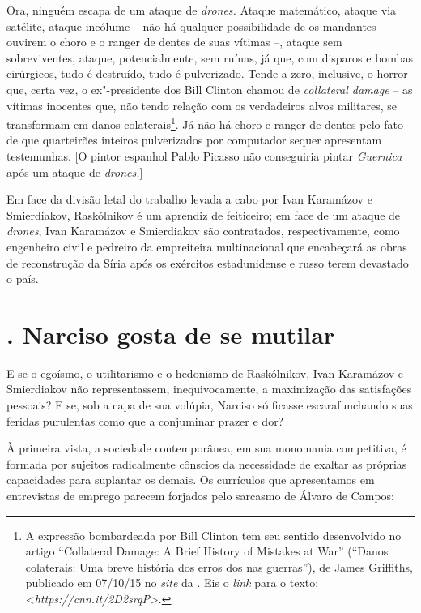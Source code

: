Ora, ninguém escapa de um ataque de \emph{drones.} Ataque matemático,
ataque via satélite, ataque incólume -- não há qualquer possibilidade de
os mandantes ouvirem o choro e o ranger de dentes de suas vítimas --,
ataque sem sobreviventes, ataque, potencialmente, sem ruínas, já que,
com disparos e bombas cirúrgicos, tudo é destruído, tudo é pulverizado.
Tende a zero, inclusive, o horror que, certa vez, o ex"-presidente dos
 Bill Clinton chamou de \emph{collateral damage} -- as vítimas
inocentes que, não tendo relação com os verdadeiros alvos militares, se
transformam em danos colaterais\footnote{A expressão bombardeada por
  Bill Clinton tem seu sentido desenvolvido no artigo ``Collateral
  Damage: A Brief History of  Mistakes at War'' (``Danos colaterais:
  Uma breve história dos erros dos  nas guerras''), de James
  Griffiths, publicado em 07/10/15 no \emph{site} da \emph{}. Eis o
  \emph{link} para o texto: \textless{}\emph{https://cnn.it/2D2srqP}\textgreater{}.}.
Já não há choro e ranger de dentes pelo fato de que quarteirões inteiros
pulverizados por computador sequer apresentam testemunhas. {[}O pintor
espanhol Pablo Picasso não conseguiria pintar \emph{Guernica} após um
ataque de \emph{drones.}{]}

Em face da divisão letal do trabalho levada a cabo por Ivan Karamázov e
Smierdiakov, Raskólnikov é um aprendiz de feiticeiro; em face de um
ataque de \emph{drones}, Ivan Karamázov e Smierdiakov são contratados,
respectivamente, como engenheiro civil e pedreiro da empreiteira
multinacional que encabeçará as obras de reconstrução da Síria após os
exércitos estadunidense e russo terem devastado o país.

\section{. Narciso gosta de se mutilar}

E se o egoísmo, o utilitarismo e o hedonismo de Raskólnikov, Ivan
Karamázov e Smierdiakov não representassem, inequivocamente, a
maximização das satisfações pessoais? E se, sob a capa de sua volúpia,
Narciso só ficasse escarafunchando suas feridas purulentas como que a
conjuminar prazer e dor?

À primeira vista, a sociedade contemporânea, em sua monomania
competitiva, é formada por sujeitos radicalmente cônscios da necessidade
de exaltar as próprias capacidades para suplantar os demais. Os
currículos que apresentamos em entrevistas de emprego parecem forjados
pelo sarcasmo de Álvaro de Campos:

